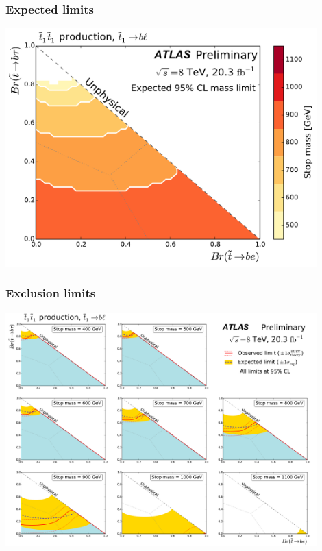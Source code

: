 \documentclass[10pt, svgnames]{beamer}
\newcommand{\backupend}{
   \addtocounter{framenumbervorappendix}{-\value{framenumber}}
   \addtocounter{framenumber}{\value{framenumbervorappendix}} 
}
\begin{document}
\begin{frame}
  \frametitle{Expected limits}
  \begin{center}
    \includegraphics[width=0.9\textwidth]
    {figures/blstop/mass_limit_contours_no_extras_exp.pdf}
  \end{center}
\end{frame}


\begin{frame}
  \frametitle{Exclusion limits}
  \begin{center}
    \includegraphics[width=0.9\textwidth]{figures/blstop/limit_contours.pdf}
  \end{center}
\end{frame}




\backupend
\end{document}
